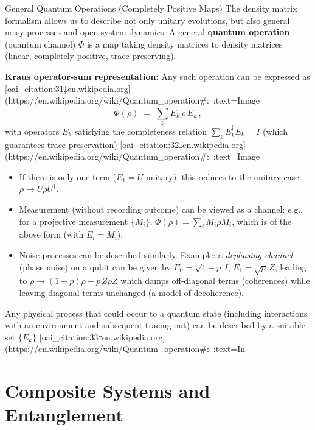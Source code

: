 \begin{frame}{General Quantum Operations (Completely Positive Maps)}
  The density matrix formalism allows us to describe not only unitary evolutions, but also general noisy processes and open-system dynamics. A general \textbf{quantum operation} (quantum channel) $\Phi$ is a map taking density matrices to density matrices (linear, completely positive, trace-preserving). \\
  \medskip

  \textbf{Kraus operator-sum representation:} Any such operation can be expressed as [oai_citation:31‡en.wikipedia.org](https://en.wikipedia.org/wiki/Quantum_operation#:~:text=Image%
  \[
     \Phi(\rho) \;=\; \sum_k E_k\, \rho\, E_k^\dagger\,,
  \] 
  with operators $E_k$ satisfying the completeness relation $\sum_k E_k^\dagger E_k = I$ (which guarantees trace-preservation) [oai_citation:32‡en.wikipedia.org](https://en.wikipedia.org/wiki/Quantum_operation#:~:text=Image%
  \begin{itemize}
    \item If there is only one term ($E_1 = U$ unitary), this reduces to the unitary case $\rho \to U \rho U^\dagger$.
    \item Measurement (without recording outcome) can be viewed as a channel: e.g., for a projective measurement $\{M_i\}$, $\Phi(\rho) = \sum_i M_i \rho M_i$, which is of the above form (with $E_i = M_i$).
    \item Noise processes can be described similarly. Example: a \emph{dephasing channel} (phase noise) on a qubit can be given by $E_0=\sqrt{1-p}\,I$, $E_1=\sqrt{p}\,Z$, leading to $\rho \to (1-p)\rho + p\,Z\rho Z$ which damps off-diagonal terms (coherences) while leaving diagonal terms unchanged (a model of decoherence).
  \end{itemize}
  Any physical process that could occur to a quantum state (including interactions with an environment and subsequent tracing out) can be described by a suitable set $\{E_k\}$ [oai_citation:33‡en.wikipedia.org](https://en.wikipedia.org/wiki/Quantum_operation#:~:text=In%
\end{frame}

\section{Composite Systems and Entanglement}

